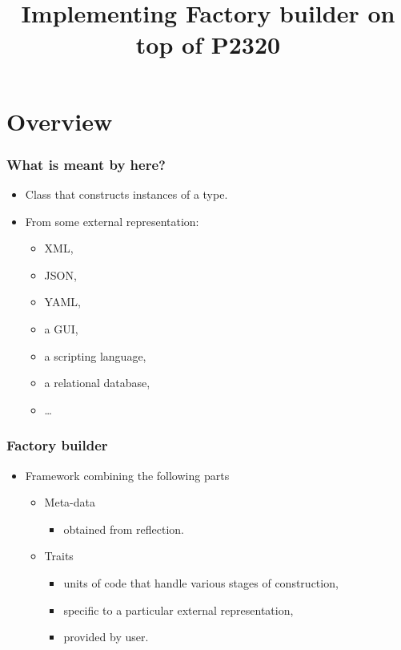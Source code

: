 \documentclass[compress,table,xcolor=table]{beamer}
\begin{document}
\title{Implementing Factory builder on top of P2320}
\section{Overview}
\frame{\titlepage}
\begin{frame}
    \Huge
    \vfill
    \LARGE
\end{frame}
\begin{frame}
\frametitle{What is meant by  here?}
  \Large
  \begin{itemize}
      \item Class that constructs instances of a  type.
      \item From some external representation:
      \begin{itemize}
        \large
      \item XML,
      \item JSON,
      \item YAML,
      \item a GUI,
      \item a scripting language,
      \item a relational database,
      \item \ldots
      \end{itemize}
  \end{itemize}
\end{frame}
\begin{frame}
  \frametitle{Factory builder}
    \Huge
  \begin{itemize}
    \item{Framework combining the following parts}
    \begin{itemize}
      \LARGE
    \item Meta-data 
          \begin{itemize}
          \Large
        \item obtained from reflection.
          \end{itemize}
    \item Traits
          \begin{itemize}
          \Large
        \item units of code that handle various stages of construction,
        \item specific to a particular external representation,
        \item provided by user.
        \end{itemize}
      \end{itemize}
  \end{itemize}
\end{frame}
\end{document}
